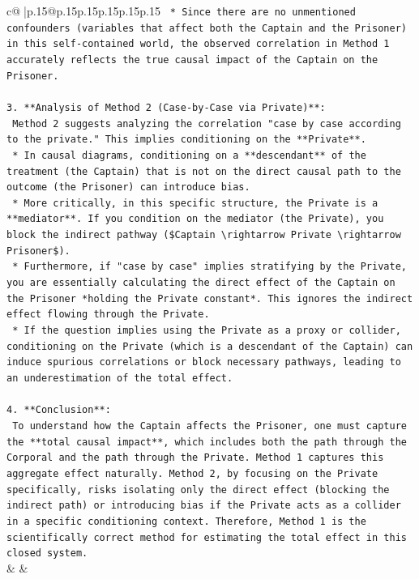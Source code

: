 \documentclass{article}
\begin{document}
{\begin{supertabular}{c@{$\;$}|p{.15\linewidth}@{}p{.15\linewidth}p{.15\linewidth}p{.15\linewidth}p{.15\linewidth}p{.15\linewidth}}
{{{\texttt{    *   Since there are no unmentioned confounders (variables that affect both the Captain and the Prisoner) in this self{-}contained world, the observed correlation in Method 1 accurately reflects the true causal impact of the Captain on the Prisoner.} \\
\\ 
\texttt{3.  **Analysis of Method 2 (Case{-}by{-}Case via Private)**:} \\
\texttt{    Method 2 suggests analyzing the correlation "case by case according to the private." This implies conditioning on the **Private**.} \\
\texttt{    *   In causal diagrams, conditioning on a **descendant** of the treatment (the Captain) that is not on the direct causal path to the outcome (the Prisoner) can introduce bias.} \\
\texttt{    *   More critically, in this specific structure, the Private is a **mediator**. If you condition on the mediator (the Private), you block the indirect pathway (\$Captain \textbackslash{}rightarrow Private \textbackslash{}rightarrow Prisoner\$).} \\
\texttt{    *   Furthermore, if "case by case" implies stratifying by the Private, you are essentially calculating the direct effect of the Captain on the Prisoner *holding the Private constant*. This ignores the indirect effect flowing through the Private.} \\
\texttt{    *   If the question implies using the Private as a proxy or collider, conditioning on the Private (which is a descendant of the Captain) can induce spurious correlations or block necessary pathways, leading to an underestimation of the total effect.} \\
\\ 
\texttt{4.  **Conclusion**:} \\
\texttt{    To understand how the Captain affects the Prisoner, one must capture the **total causal impact**, which includes both the path through the Corporal and the path through the Private. Method 1 captures this aggregate effect naturally. Method 2, by focusing on the Private specifically, risks isolating only the direct effect (blocking the indirect path) or introducing bias if the Private acts as a collider in a specific conditioning context. Therefore, Method 1 is the scientifically correct method for estimating the total effect in this closed system.} \\
            }
        }
    }
    & & \\ \\


\end{supertabular}}
\end{document}

